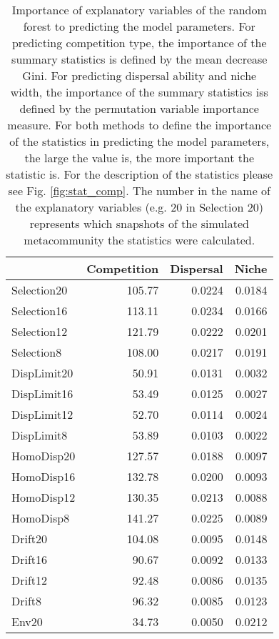 
\noindent
	\begin{longtable}{l|rrr}
		\caption[Importance of explanatory variables of the random forest to predicting the model parameters.]{\small
			Importance of explanatory variables of the random forest to predicting the model parameters. For predicting competition type, the importance of the summary statistics is defined by the mean decrease Gini. For predicting dispersal ability and niche width, the importance of the summary statistics iss defined by the permutation variable importance measure. For both methods to define the importance of the statistics in predicting the model parameters, the large the value is, the more important the statistic is. For the description of the statistics please see Fig. \ref{fig:stat_comp}. The number in the name of the explanatory variables (e.g. 20 in Selection 20) represents which snapshots of the simulated metacommunity the statistics were calculated.}
		\label{tbl:impo}
		\endfirsthead
		\toprule
		\multicolumn{1}{l}{} & Competition & Dispersal & Niche \\ 
		\midrule
		Selection20 & 105.77 & 0.0224 & 0.0184 \\ 
		Selection16 & 113.11 & 0.0234 & 0.0166 \\ 
		Selection12 & 121.79 & 0.0222 & 0.0201 \\ 
		Selection8 & 108.00 & 0.0217 & 0.0191 \\ 
		DispLimit20 & 50.91 & 0.0131 & 0.0032 \\ 
		DispLimit16 & 53.49 & 0.0125 & 0.0027 \\ 
		DispLimit12 & 52.70 & 0.0114 & 0.0024 \\ 
		DispLimit8 & 53.89 & 0.0103 & 0.0022 \\ 
		HomoDisp20 & 127.57 & 0.0188 & 0.0097 \\ 
		HomoDisp16 & 132.78 & 0.0200 & 0.0093 \\ 
		HomoDisp12 & 130.35 & 0.0213 & 0.0088 \\ 
		HomoDisp8 & 141.27 & 0.0225 & 0.0089 \\ 
		Drift20 & 104.08 & 0.0095 & 0.0148 \\ 
		Drift16 & 90.67 & 0.0092 & 0.0133 \\ 
		Drift12 & 92.48 & 0.0086 & 0.0135 \\ 
		Drift8 & 96.32 & 0.0085 & 0.0123 \\ 
		Env20 & 34.73 & 0.0050 & 0.0212 \\ 

\end{longtable}
